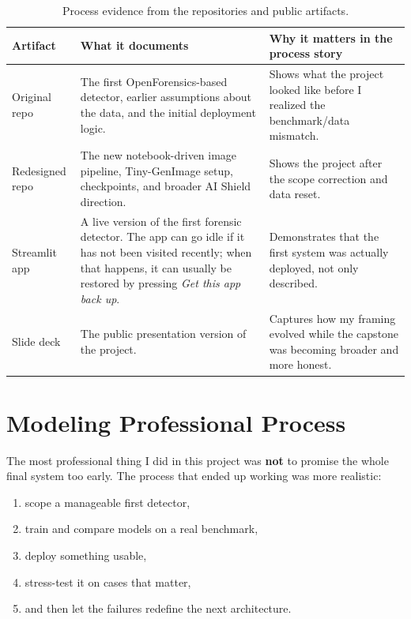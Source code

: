 \documentclass[11pt]{article}
\begin{document}
\begin{table}[H]
\centering
\small
\begin{tabularx}{0.98\textwidth}{>{\raggedright\arraybackslash}p{3.2cm} >{\raggedright\arraybackslash}X >{\raggedright\arraybackslash}p{3.4cm}}
\toprule
\textbf{Artifact} & \textbf{What it documents} & \textbf{Why it matters in the process story}\\
\midrule
Original repo & The first OpenForensics-based detector, earlier assumptions about the data, and the initial deployment logic. & Shows what the project looked like before I realized the benchmark/data mismatch.\\
Redesigned repo & The new notebook-driven image pipeline, Tiny-GenImage setup, checkpoints, and broader AI Shield direction. & Shows the project after the scope correction and data reset.\\
Streamlit app & A live version of the first forensic detector. The app can go idle if it has not been visited recently; when that happens, it can usually be restored by pressing \emph{Get this app back up}. & Demonstrates that the first system was actually deployed, not only described.\\
Slide deck & The public presentation version of the project. & Captures how my framing evolved while the capstone was becoming broader and more honest.\\
\bottomrule
\end{tabularx}
\caption{Process evidence from the repositories and public artifacts.}
\end{table}

\section{Modeling Professional Process}

The most professional thing I did in this project was \textbf{not} to promise the whole final system too early. The process that ended up working was more realistic:
\begin{enumerate}[leftmargin=1.5em]
    \item scope a manageable first detector,
    \item train and compare models on a real benchmark,
    \item deploy something usable,
    \item stress-test it on cases that matter,
    \item and then let the failures redefine the next architecture.
\end{enumerate}
\end{document}
